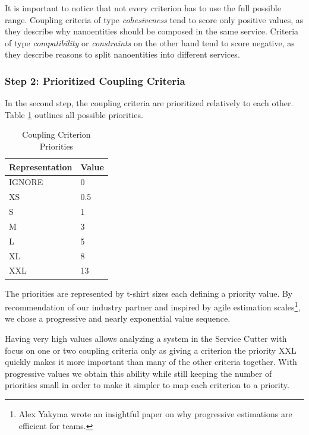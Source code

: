 It is important to notice that not every criterion has to use the full possible range. Coupling criteria of type \textit{cohesiveness} tend to score only positive values, as they describe why nanoentities should be composed in the same service. Criteria of type \textit{compatibility} or \textit{constraints} on the other hand tend to score negative, as they describe reasons to split nanoentities into different services.

\subsubsection{Step 2: Prioritized Coupling Criteria}

In the second step, the coupling criteria are prioritized relatively to each other. Table \ref{tab:priorities} outlines all possible priorities.

\begin{table}[H]
	\centering
	\caption{Coupling Criterion Priorities}
	\label{tab:priorities}
	\begin{tabular}{|p{70pt}|p{30pt}|}
		\hline	
		Representation & Value  \\
		\hline
		IGNORE & 0  \\
		\hline
		XS & 0.5  \\
		\hline
		S & 1  \\
		\hline
		M & 3  \\
		\hline
		L & 5  \\
		\hline
		XL & 8  \\
		\hline
		XXL & 13  \\
		\hline
	\end{tabular}
\end{table}

The priorities are represented by t-shirt sizes each defining a priority value. By recommendation of our industry partner and inspired by agile estimation scales\footnote{Alex Yakyma wrote an insightful paper on why progressive estimations are efficient for teams\cite{estimation}.}, we chose a progressive and nearly exponential value sequence. 

Having very high values allows analyzing a system in the Service Cutter with focus on one or two coupling criteria only as giving a criterion the priority XXL quickly makes it more important than many of the other criteria together. With progressive values we obtain this ability while still keeping the number of priorities small in order to make it simpler to map each criterion to a priority. 

